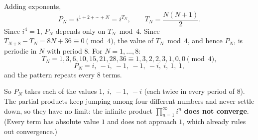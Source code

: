 Adding exponents,
\[P_N=i^{1+2+\cdots+N}=i^{T_N},\qquad T_N=\dfrac{N(N+1)}{2}.\]
Since $i^4=1$, $P_N$ depends only on $T_N\bmod 4$. Since $T_{N+8}-T_N=8N+36\equiv0\pmod4$, the value of $T_N\bmod4$, and hence $P_N$, is periodic in $N$ with period $8$. For $N=1,\dots,8$:
\[T_N=1,3,6,10,15,21,28,36\equiv1,3,2,2,3,1,0,0\pmod4,\]
\[P_N=i,\ -i,\ -1,\ -1,\ -i,\ i,\ 1,\ 1,\]
and the pattern repeats every $8$ terms.

So $P_N$ takes each of the values $\boxed{1,\ i,\ -1,\ -i}$ (each twice in every period of $8$). The partial products keep jumping among four different numbers and never settle down, so they have no limit: the infinite product $\displaystyle\prod_{n=1}^{\infty}i^n$ \textbf{does not converge}. (Every term has absolute value $1$ and does not approach $1$, which already rules out convergence.)
